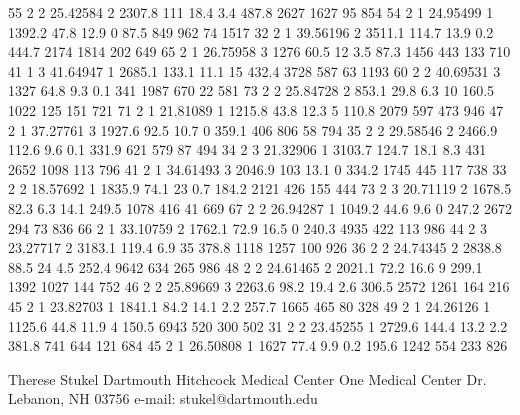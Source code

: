 55	2	2	25.42584	2	2307.8	111		18.4	3.4		487.8	2627	1627	95		854
54	2	1	24.95499	1	1392.2	47.8	12.9	0		87.5	849		962		74		1517
32	2	1	39.56196	2	3511.1	114.7	13.9	0.2		444.7	2174	1814	202		649
65	2	1	26.75958	3	1276	60.5	12		3.5		87.3	1456	443		133		710
41	1	3	41.64947	1	2685.1	133.1	11.1	15		432.4	3728	587		63		1193
60	2	2	40.69531	3	1327	64.8	9.3		0.1		341		1987	670		22		581
73	2	2	25.84728	2	853.1	29.8	6.3		10		160.5	1022	125		151		721
71	2	1	21.81089	1	1215.8	43.8	12.3	5		110.8	2079	597		473		946
47	2	1	37.27761	3	1927.6	92.5	10.7	0		359.1	406		806		58		794
35	2	2	29.58546	2	2466.9	112.6	9.6		0.1		331.9	621		579		87		494
34	2	3	21.32906	1	3103.7	124.7	18.1	8.3		431		2652	1098	113		796
41	2	1	34.61493	3	2046.9	103		13.1	0		334.2	1745	445		117		738
33	2	2	18.57692	1	1835.9	74.1	23		0.7		184.2	2121	426		155		444
73	2	3	20.71119	2	1678.5	82.3	6.3		14.1	249.5	1078	416		41		669
67	2	2	26.94287	1	1049.2	44.6	9.6		0		247.2	2672	294		73		836
66	2	1	33.10759	2	1762.1	72.9	16.5	0		240.3	4935	422		113		986
44	2	3	23.27717	2	3183.1	119.4	6.9		35		378.8	1118	1257	100		926
36	2	2	24.74345	2	2838.8	88.5	24		4.5		252.4	9642	634		265		986
48	2	2	24.61465	2	2021.1	72.2	16.6	9		299.1	1392	1027	144		752
46	2	2	25.89669	3	2263.6	98.2	19.4	2.6		306.5	2572	1261	164		216
45	2	1	23.82703	1	1841.1	84.2	14.1	2.2		257.7	1665	465		80		328
49	2	1	24.26126	1	1125.6	44.8	11.9	4		150.5	6943	520		300		502
31	2	2	23.45255	1	2729.6	144.4	13.2	2.2		381.8	741		644		121		684
45	2	1	26.50808	1	1627	77.4	9.9		0.2		195.6	1242	554		233		826



Therese Stukel
Dartmouth Hitchcock Medical Center
One Medical Center Dr.
Lebanon, NH 03756
e-mail: stukel@dartmouth.edu

